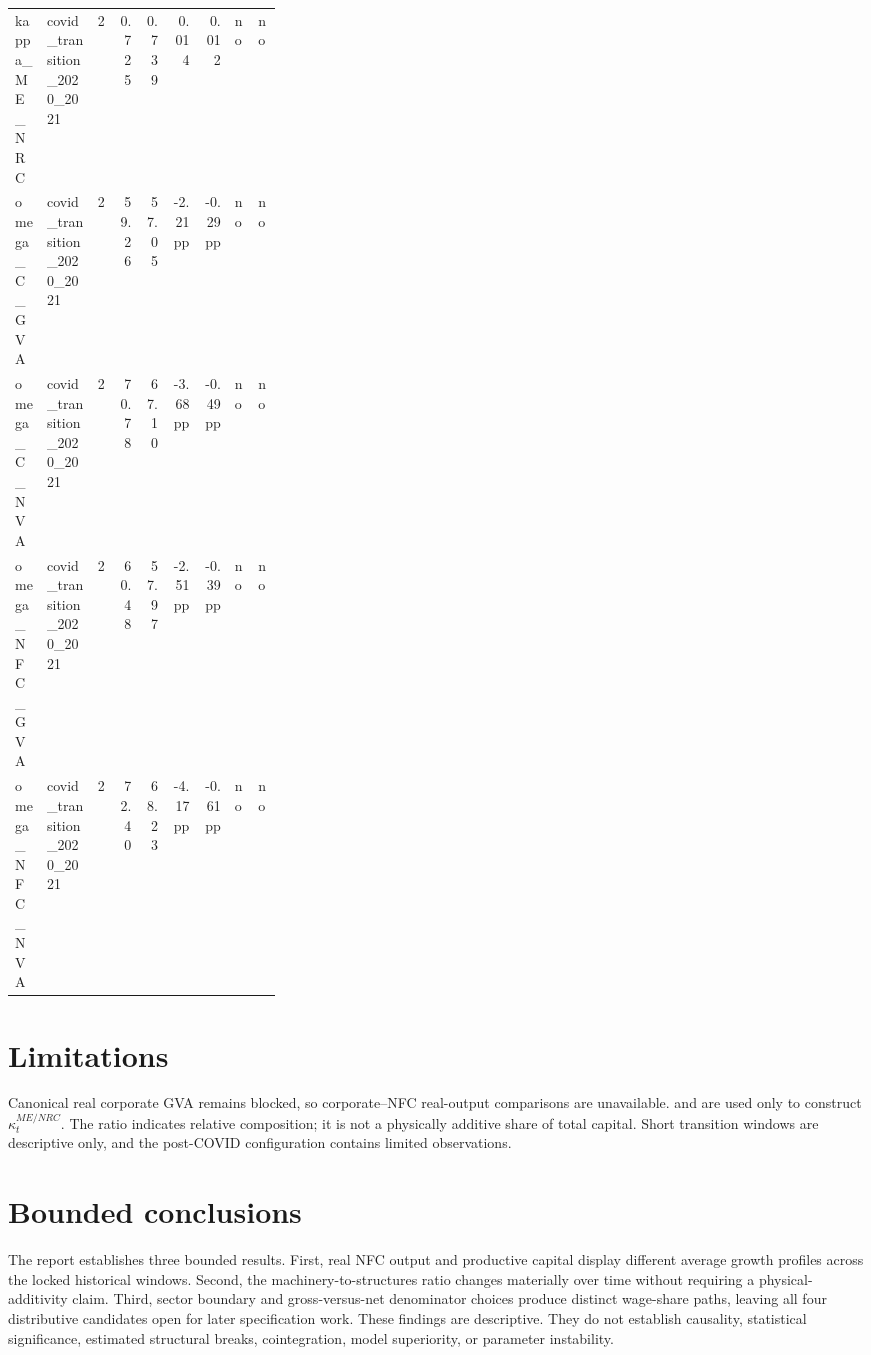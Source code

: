 \documentclass[11pt]{article}
\newcommand{\code}[1]{\texttt{\detokenize{#1}}}
\begin{document}
\begin{landscape}
\begin{center}
\begin{longtable}{p{0.12\linewidth}p{0.19\linewidth}rrrrrll}
kappa\_\allowbreak{}ME\_\allowbreak{}NRC & covid\_\allowbreak{}transition\_\allowbreak{}2020\_\allowbreak{}2021 & 2 & 0.725 & 0.739 & 0.014 & 0.012 & no & no \\
omega\_\allowbreak{}C\_\allowbreak{}GVA & covid\_\allowbreak{}transition\_\allowbreak{}2020\_\allowbreak{}2021 & 2 & 59.26 & 57.05 & -2.21 pp & -0.29 pp & no & no \\
omega\_\allowbreak{}C\_\allowbreak{}NVA & covid\_\allowbreak{}transition\_\allowbreak{}2020\_\allowbreak{}2021 & 2 & 70.78 & 67.10 & -3.68 pp & -0.49 pp & no & no \\
omega\_\allowbreak{}NFC\_\allowbreak{}GVA & covid\_\allowbreak{}transition\_\allowbreak{}2020\_\allowbreak{}2021 & 2 & 60.48 & 57.97 & -2.51 pp & -0.39 pp & no & no \\
omega\_\allowbreak{}NFC\_\allowbreak{}NVA & covid\_\allowbreak{}transition\_\allowbreak{}2020\_\allowbreak{}2021 & 2 & 72.40 & 68.23 & -4.17 pp & -0.61 pp & no & no \\
\bottomrule
\end{longtable}
\normalsize
\end{center}
\end{landscape}
\section{Limitations}
Canonical real corporate GVA remains blocked, so corporate--NFC real-output comparisons are unavailable. \code{G_ME_GPIM_2017} and \code{G_NRC_GPIM_2017} are used only to construct $\kappa_t^{ME/NRC}$. The ratio indicates relative composition; it is not a physically additive share of total capital. Short transition windows are descriptive only, and the post-COVID configuration contains limited observations.
\section{Bounded conclusions}
The report establishes three bounded results. First, real NFC output and productive capital display different average growth profiles across the locked historical windows. Second, the machinery-to-structures ratio changes materially over time without requiring a physical-additivity claim. Third, sector boundary and gross-versus-net denominator choices produce distinct wage-share paths, leaving all four distributive candidates open for later specification work.
These findings are descriptive. They do not establish causality, statistical significance, estimated structural breaks, cointegration, model superiority, or parameter instability.
\appendix
\end{document}

